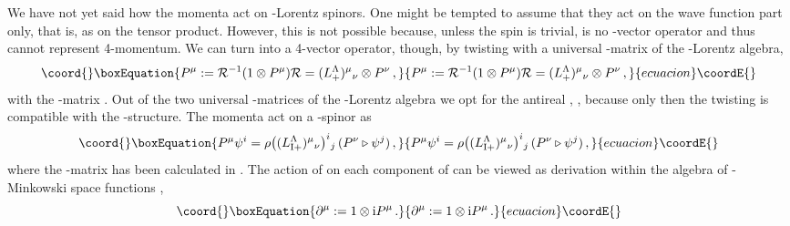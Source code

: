 \documentclass[12pt,a4paper]{article}
\providecommand{\I}{\mathrm{i}}
\providecommand{\tr}{\triangleright}
\providecommand{\R}{\mathcal{R}}
\providecommand{\RI}{ \mathcal{R}_{\mathrm{I}} }
\providecommand{\Xcal}{\mathcal{X}}
\providecommand{\Scal}{\mathcal{S}}
\begin{document}
We have not yet said how the momenta \coordHE{} act on \coordHE{}-Lorentz
spinors. One might be tempted to assume that they act on the wave
function part only, that is, as \coordHE{} on the tensor
product. However, this is not possible because, unless the spin \myHighlight{$\Scal
= \mathbb{C}$}\coordHE{} is trivial, \coordHE{} is no \coordHE{}-vector operator
and thus cannot represent 4-momentum. We can turn \coordHE{}
into a 4-vector operator, though, by twisting \coordHE{} with a
universal \myHighlight{$\R$}\coordHE{}-matrix \myHighlight{$\R = \R_{[1]} \otimes \R_{[2]}$}\coordHE{} of the
\coordHE{}-Lorentz algebra,
\begin{equation}\coord{}\boxEquation{
  P^\mu := \R^{-1}(1\otimes P^\mu)\R =
           (L^\Lambda_+)^{\mu}{}_{\nu} \otimes P^{\nu} \,,
}{
  P^\mu := \R^{-1}(1\otimes P^\mu)\R =
           (L^\Lambda_+)^{\mu}{}_{\nu} \otimes P^{\nu} \,,
}{ecuacion}\coordE{}\end{equation}
with the \coordHE{}-matrix \myHighlight{$(L^\Lambda_+)^\mu{}_\nu := \R_{[1]}
\Lambda(\R_{[2]})^\mu{}_\nu$}\coordHE{}. Out of the two universal \myHighlight{$\R$}\coordHE{}-matrices
of the \coordHE{}-Lorentz algebra we opt for the antireal \myHighlight{$\RI$}\coordHE{},
\myHighlight{$\RI^{*\otimes *} = \RI^{-1}$}\coordHE{}, because only then the twisting is
compatible with the \myHighlight{$*$}\coordHE{}-structure. The momenta act on a \myHighlight{$\rho$}\coordHE{}-spinor
as
\begin{equation}\coord{}\boxEquation{
  P^\mu \psi^i
  = \rho\bigl( (L^\Lambda_{\mathrm{I}+})^{\mu}{}_{\nu}\bigr)^i{}_j
  \,(P^{\nu} \tr \psi^j) \,,
}{
  P^\mu \psi^i
  = \rho\bigl( (L^\Lambda_{\mathrm{I}+})^{\mu}{}_{\nu}\bigr)^i{}_j
  \,(P^{\nu} \tr \psi^j) \,,
}{ecuacion}\coordE{}\end{equation}
where the \coordHE{}-matrix has been calculated in \cite{Blohmann}. The
action of \coordHE{} on each component of \coordHE{} can be viewed as
derivation within the algebra of \coordHE{}-Minkowski space functions
\myHighlight{$\Xcal$}\coordHE{},
\begin{equation}\coord{}\boxEquation{
  \partial^\mu := 1\otimes \I P^\mu \,.
}{
  \partial^\mu := 1\otimes \I P^\mu \,.
}{ecuacion}\coordE{}\end{equation}
\end{document}
